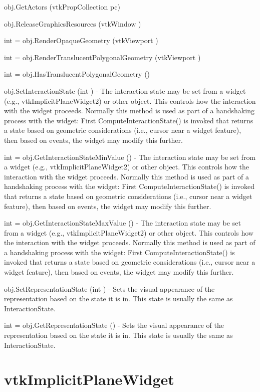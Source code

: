 \begin{DoxyItemize}
\item {\ttfamily obj.\-Get\-Actors (vtk\-Prop\-Collection pc)}  
\item {\ttfamily obj.\-Release\-Graphics\-Resources (vtk\-Window )}  
\item {\ttfamily int = obj.\-Render\-Opaque\-Geometry (vtk\-Viewport )}  
\item {\ttfamily int = obj.\-Render\-Translucent\-Polygonal\-Geometry (vtk\-Viewport )}  
\item {\ttfamily int = obj.\-Has\-Translucent\-Polygonal\-Geometry ()}  
\item {\ttfamily obj.\-Set\-Interaction\-State (int )} -\/ The interaction state may be set from a widget (e.\-g., vtk\-Implicit\-Plane\-Widget2) or other object. This controls how the interaction with the widget proceeds. Normally this method is used as part of a handshaking process with the widget\-: First Compute\-Interaction\-State() is invoked that returns a state based on geometric considerations (i.\-e., cursor near a widget feature), then based on events, the widget may modify this further.  
\item {\ttfamily int = obj.\-Get\-Interaction\-State\-Min\-Value ()} -\/ The interaction state may be set from a widget (e.\-g., vtk\-Implicit\-Plane\-Widget2) or other object. This controls how the interaction with the widget proceeds. Normally this method is used as part of a handshaking process with the widget\-: First Compute\-Interaction\-State() is invoked that returns a state based on geometric considerations (i.\-e., cursor near a widget feature), then based on events, the widget may modify this further.  
\item {\ttfamily int = obj.\-Get\-Interaction\-State\-Max\-Value ()} -\/ The interaction state may be set from a widget (e.\-g., vtk\-Implicit\-Plane\-Widget2) or other object. This controls how the interaction with the widget proceeds. Normally this method is used as part of a handshaking process with the widget\-: First Compute\-Interaction\-State() is invoked that returns a state based on geometric considerations (i.\-e., cursor near a widget feature), then based on events, the widget may modify this further.  
\item {\ttfamily obj.\-Set\-Representation\-State (int )} -\/ Sets the visual appearance of the representation based on the state it is in. This state is usually the same as Interaction\-State.  
\item {\ttfamily int = obj.\-Get\-Representation\-State ()} -\/ Sets the visual appearance of the representation based on the state it is in. This state is usually the same as Interaction\-State.  
\end{DoxyItemize}\hypertarget{vtkwidgets_vtkimplicitplanewidget}{}\section{vtk\-Implicit\-Plane\-Widget}\label{vtkwidgets_vtkimplicitplanewidget}
